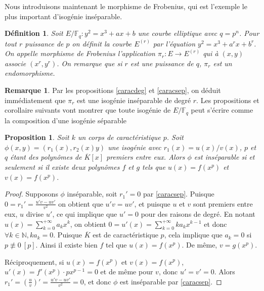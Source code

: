 \documentclass{article}
\theoremstyle{plain}%
\newtheorem{prop}[thm]{Proposition}
\newtheorem{deff}[thm]{Définition}
\theoremstyle{definition}%
\newtheorem{rem}[thm]{Remarque}
\newcommand{\F}{\mathbb{F}}
\newcommand{\N}{\mathbb{N}}
\begin{document}
Nous introduisons maintenant le morphisme de Frobenius, qui est l'exemple le plus important d'isogénie inséparable.

\begin{deff}
  Soit $E/\F_q : y^2 = x^3 + ax + b$ une courbe elliptique avec $q = p^n$. Pour tout $r$ puissance de $p$ on définit la courbe $E^{(r)}$ par l'équation $y^2 = x^3 + a^r x + b^r$. On appelle morphisme de Frobenius l'application $\pi_r : E \to E^{(r)}$ qui à $(x, y)$ associe $(x^r, y^r)$. On remarque que si $r$ est une puissance de $q$, $\pi_r$ est un endomorphisme.
\end{deff}


\begin{rem}
  \label{degpi}
  Par les propositions \ref{caracdeg} et \ref{caracsep}, on déduit immédiatement que $\pi_r$ est une isogénie inséparable de degré $r$. Les propositions et corollaire suivants vont montrer que toute isogénie de $E/\F_q$ peut s'écrire comme la composition d'une isogénie séparable 
\end{rem}



\begin{prop}
  Soit $k$ un corps de caractéristique $p$. Soit $\phi(x, y) = (r_1(x), r_2(x)y)$ une isogénie avec $r_1(x) = u(x)/v(x)$, $p$ et $q$ étant des polynômes de $\overline{K}[x]$ premiers entre eux. Alors $\phi$ est inséparable si et seulement si il existe deux polynômes $f$ et $g$ tels que $u(x) = f(x^p)$ et $v(x) = f(x^p)$.
\end{prop}


\begin{proof}
  Supposons $\phi$ inséparable, soit $r_1' = 0$ par \ref{caracsep}. Puisque $0 = r_1' = \frac{u'v -uv'}{v^2}$ on obtient que $u'v = uv'$, et puisque $u$ et $v$ sont premiers entre eux, $u$ divise $u'$, ce qui implique que $u' = 0$ pour des raisons de degré.  En notant $u(x) = \sum_{k=0}^{+\infty} a_kx^k$, on obtient $0 = u'(x) = \sum_{k=0}^{+\infty} ka_kx^{k-1}$ et donc $\forall k\in \N, ka_k = 0$. Puisque $\overline{K}$ est de caractéristique $p$, cela implique que $a_k = 0$ si $p\not\equiv 0\ [p]$. Ainsi il existe bien $f$ tel que $u(x) = f(x^p)$. De même, $v = g(x^p)$. 

  Réciproquement, si $u(x) = f(x^p)$ et $v(x) = f(x^p)$, $u'(x) = f'(x^p)\cdot px^{p-1} = 0$ et de même pour $v$, donc $u' = v' = 0$. Alors $r_1' = (\frac{u}{v})' =  \frac{u'v -uv'}{v^2} = 0$, et donc $\phi$ est inséparable par \ref{caracsep}.
\end{proof}
\end{document}
